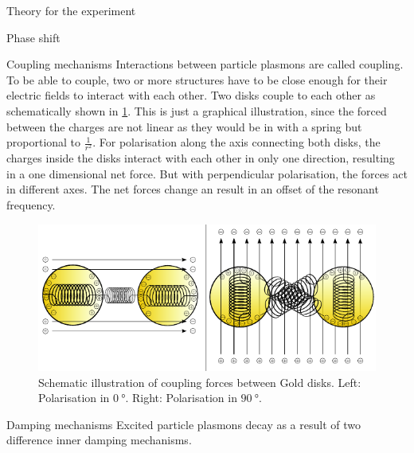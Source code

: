 \documentclass[pdftex, a4paper,11pt, twoside, UKenglish]{report}
\begin{document}
\begin{chapter}{Theory for the experiment}
\begin{section}{Phase shift}
    \end{section}
    
    
    
    \begin{section}{Coupling mechanisms}
      \label{chp:TheoryCoupling}
      Interactions between particle plasmons are called coupling.
      To be able to couple, two or more structures have to be close enough for
      their electric fields to interact with each other. 
      Two disks couple to each other as schematically shown in
      \cref{fig:Coupling}. This is just a graphical illustration, since
      the forced between the charges are not linear as they would be in with a
      spring but proportional to $\frac{1}{r^{2}}$. For polarisation along the
      axis connecting both disks, the charges inside the disks interact with
      each other in only one direction, resulting in a one dimensional net
      force. But with perpendicular polarisation, the forces act in different
      axes. The net forces change an result in an offset of the resonant
      frequency. 
      \begin{figure}[htbp]
        \centering
        \includegraphics[width=\textwidth]{Figures/Coupling.png}
        \caption{Schematic illustration of coupling forces between Gold disks. 
            Left: Polarisation in $\SI{0}{\degree}$. 
            Right: Polarisation in $\SI{90}{\degree}$. }
        \label{fig:Coupling}
      \end{figure}
      
    \end{section}
    
    
    
    \begin{section}{Damping mechanisms}
      \label{chp:TheoryDamping}
      Excited particle plasmons decay as a result of two difference inner
      damping mechanisms. 
      

\end{section}
\end{chapter}
\end{document}
